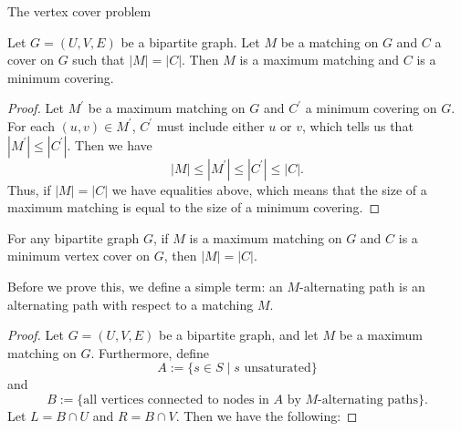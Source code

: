 \documentclass[11pt]{article}
\renewcommand{\'}{^{'}}
\newenvironment{theorem}[2][Theorem]{\begin{trivlist}
\item[\hskip \labelsep {\bfseries #1}\hskip \labelsep {\bfseries #2.}]}{\end{trivlist}}
\newenvironment{lemma}[2][Lemma]{\begin{trivlist}
\item[\hskip \labelsep {\bfseries #1}\hskip \labelsep {\bfseries #2.}]}{\end{trivlist}}
\begin{document}
\begin{section}{The vertex cover problem}
	\begin{lemma}{}
		Let $G=(U,V,E)$ be a bipartite graph. Let $M$ be a matching on $G$ and $C$ a cover on 
		$G$ such that $|M| = |C|$. Then $M$ is a maximum matching and $C$ is a minimum 
		covering.
	\end{lemma}

	\begin{proof}
		Let $M\'$ be a maximum matching on $G$ and $C\'$ a minimum covering on $G$. For each 
		$(u,v)\in M\'$, $C\'$ must include either $u$ or $v$, which tells us that 
		$|M\'| \leq |C\'|$. Then we have 
		\[
			|M|\leq |M\'| \leq |C\'| \leq |C|.
		\]
		Thus, if $|M| = |C|$ we have equalities above, which means that the size of a maximum 
		matching is equal to the size of a minimum covering.
	\end{proof}

	\begin{theorem}{(K\H{o}nig-Egervary)}
		For any bipartite graph $G$, if $M$ is a maximum matching on $G$ and $C$ is a minimum 
		vertex cover  on $G$, then $|M| = |C|$.
	\end{theorem}
	Before we prove this, we define a simple term: an $M$-alternating path is an alternating path 
	with respect to a matching $M$.

	\begin{proof}
		Let $G=(U,V,E)$ be a bipartite graph, and let $M$ be a maximum matching on $G$. 
		Furthermore, define
		\[
			A := \{s\in S\; |\; s \text{ unsaturated}\}
		\]
		and
		\[
			B := \{\text{all vertices connected to nodes in $A$ by $M$-alternating paths}\}
			.
		\]
		Let $L = B\cap U$ and $R = B\cap V$. Then we have the following:


\end{proof}
\end{section}
\end{document}
